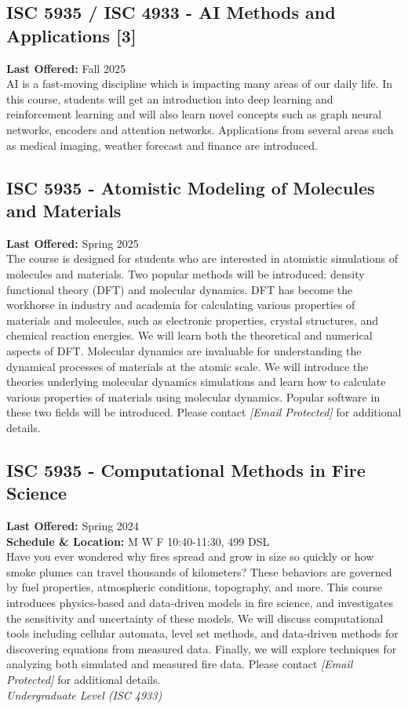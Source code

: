 \documentclass[12pt,a4paper]{article}
\begin{document}
\subsection{ISC 5935 / ISC 4933 - AI Methods and Applications [3]}
\textbf{Last Offered:} Fall 2025 \\
AI is a fast-moving discipline which is impacting many areas of our daily life. In this course, students will get an introduction into deep learning and reinforcement learning and will also learn novel concepts such as graph neural networks, encoders and attention networks. Applications from several areas such as medical imaging, weather forecast and finance are introduced.

\subsection{ISC 5935 - Atomistic Modeling of Molecules and Materials}
\textbf{Last Offered:} Spring 2025 \\
The course is designed for students who are interested in atomistic simulations of molecules and materials. Two popular methods will be introduced: density functional theory (DFT) and molecular dynamics. DFT has become the workhorse in industry and academia for calculating various properties of materials and molecules, such as electronic properties, crystal structures, and chemical reaction energies. We will learn both the theoretical and numerical aspects of DFT. Molecular dynamics are invaluable for understanding the dynamical processes of materials at the atomic scale. We will introduce the theories underlying molecular dynamics simulations and learn how to calculate various properties of materials using molecular dynamics. Popular software in these two fields will be introduced. Please contact \textit{[Email Protected]} for additional details.

\subsection{ISC 5935 - Computational Methods in Fire Science}
\textbf{Last Offered:} Spring 2024 \\
\textbf{Schedule \& Location:} M W F 10:40-11:30, 499 DSL \\
Have you ever wondered why fires spread and grow in size so quickly or how smoke plumes can travel thousands of kilometers? These behaviors are governed by fuel properties, atmospheric conditions, topography, and more. This course introduces physics-based and data-driven models in fire science, and investigates the sensitivity and uncertainty of these models. We will discuss computational tools including cellular automata, level set methods, and data-driven methods for discovering equations from measured data. Finally, we will explore techniques for analyzing both simulated and measured fire data. Please contact \textit{[Email Protected]} for additional details. \\
\textit{Undergraduate Level (ISC 4933)}
\end{document}
